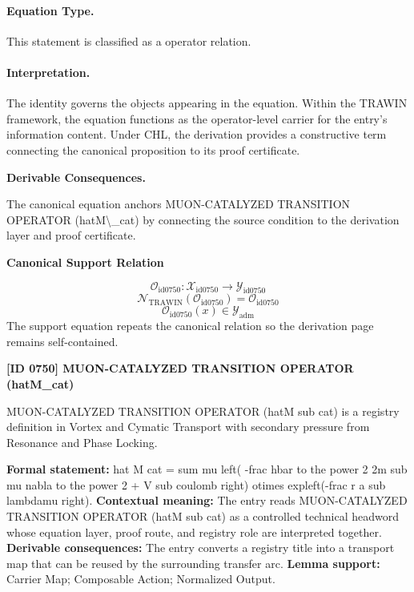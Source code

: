 \paragraph{Equation Type.}
This statement is classified as a operator relation.

\paragraph{Interpretation.}
The identity governs the objects appearing in the equation. Within the TRAWIN framework, the equation functions as the operator-level carrier for the entry’s information content. Under CHL, the derivation provides a constructive term connecting the canonical proposition to its proof certificate.

\par\vspace{0.35em}
\noindent\textbf{Derivable Consequences.}\quad
\begingroup
\footnotesize
\raggedright
The canonical equation anchors MUON-CATALYZED TRANSITION OPERATOR (hatM\textbackslash{}\_cat) by connecting the source condition to the derivation layer and proof certificate.
\par\endgroup

\noindent\textbf{Canonical Support Relation}\par
\[
\mathcal{O}_{\mathrm{id0750}}:\mathcal{X}_{\mathrm{id0750}}\longrightarrow\mathcal{Y}_{\mathrm{id0750}}
\]
\[
\mathcal{N}_{\mathrm{TRAWIN}}(\mathcal{O}_{\mathrm{id0750}})=\mathcal{O}_{\mathrm{id0750}}
\]
\[
\mathcal{O}_{\mathrm{id0750}}(x)\in\mathcal{Y}_{\mathrm{adm}}
\]
\noindent The support equation repeats the canonical relation so the derivation page remains self-contained.\par

\clearpage
\noindent\textbf{[ID 0750] MUON-CATALYZED TRANSITION OPERATOR (hatM\_cat)}\par
\vspace{0.35em}
\begingroup\small
{}
MUON-CATALYZED TRANSITION OPERATOR (hatM sub cat) is a registry definition in Vortex and Cymatic Transport with secondary pressure from Resonance and Phase Locking.

\begingroup\footnotesize\setlength{\emergencystretch}{3em}\sloppy
\textbf{Formal statement:} hat M cat = sum mu left( -frac hbar to the power 2 2m sub mu nabla to the power 2 + V sub coulomb right) otimes expleft(-frac r a sub lambdamu right). \textbf{Contextual meaning:} The entry reads MUON-CATALYZED TRANSITION OPERATOR (hatM sub cat) as a controlled technical headword whose equation layer, proof route, and registry role are interpreted together. \textbf{Derivable consequences:} The entry converts a registry title into a transport map that can be reused by the surrounding transfer arc. \textbf{Lemma support:} Carrier Map; Composable Action; Normalized Output.\par
\endgroup

